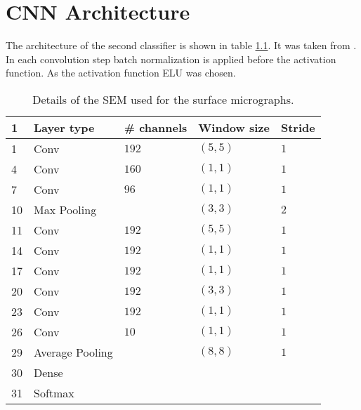 \chapter{CNN Architecture}
\label{app:Architecture}

The architecture of the second classifier is shown in table \ref{tab:SecondClassifierArchitecture}. It was taken from \cite{Lin2013}. In each convolution step batch normalization is applied before the activation function. As the activation function ELU was chosen.

\begin{table}[H]
 \begin{center}
  \begin{tabular}{@{} *5l @{}} \toprule[2pt]
   1 & Layer type & \# channels & Window size & Stride \\ \midrule
   1 & Conv & $192$ & $(5,5)$ & $1$ \\
   4 & Conv & $160$ & $(1,1)$ & $1$ \\
   7 & Conv & $96$ & $(1,1)$ & $1$ \\
   10 & Max Pooling & & $(3,3)$ & $2$ \\
   11 & Conv & $192$ & $(5,5)$ & $1$ \\
   14 & Conv & $192$ & $(1,1)$ & $1$ \\
   17 & Conv & $192$ & $(1,1)$ & $1$  \\
   20 & Conv & $192$ & $(3,3)$ & $1$ \\
   23 & Conv & $192$ & $(1,1)$ & $1$ \\
   26 & Conv & $10$ & $(1,1)$ & $1$ \\
   29 & Average Pooling & & $(8,8)$ & $1$\\
   30 & Dense & & & \\
   31 & Softmax & & &\\ \bottomrule[2pt]

  \end{tabular}
 \end{center}
 \caption{Details of the SEM used for the surface micrographs.}
   \label{tab:SecondClassifierArchitecture}
\end{table}

